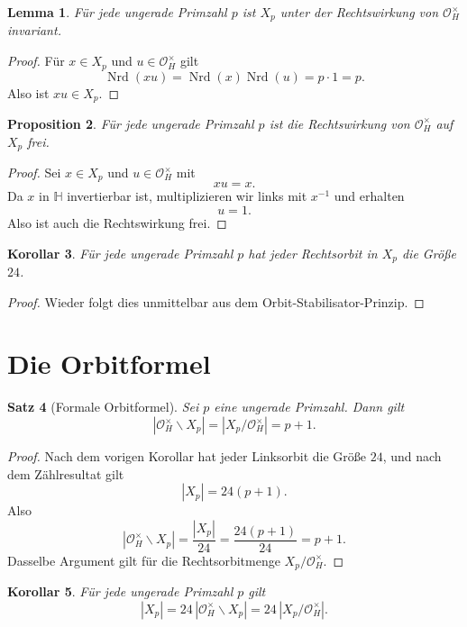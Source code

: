 \documentclass[12pt,a4paper]{article}
\theoremstyle{plain}
\newtheorem{satz}{Satz}[section]
\newtheorem{lemma}[satz]{Lemma}
\newtheorem{proposition}[satz]{Proposition}
\newtheorem{korollar}[satz]{Korollar}
\theoremstyle{definition}
\theoremstyle{remark}
\newcommand{\OH}{\mathcal O_H}
\newcommand{\QH}{\mathbb H}
\newcommand{\nrd}{\operatorname{Nrd}}
\begin{document}
	\begin{lemma}
		Für jede ungerade Primzahl \(p\) ist \(X_p\) unter der Rechtswirkung von \(\OH^\times\) invariant.
	\end{lemma}
	
	\begin{proof}
		Für \(x\in X_p\) und \(u\in\OH^\times\) gilt
		\[
		\nrd(xu)=\nrd(x)\nrd(u)=p\cdot1=p.
		\]
		Also ist \(xu\in X_p\).
	\end{proof}
	
	\begin{proposition}
		Für jede ungerade Primzahl \(p\) ist die Rechtswirkung von \(\OH^\times\) auf \(X_p\) frei.
	\end{proposition}
	
	\begin{proof}
		Sei \(x\in X_p\) und \(u\in\OH^\times\) mit
		\[
		xu=x.
		\]
		Da \(x\) in \(\QH\) invertierbar ist, multiplizieren wir links mit \(x^{-1}\) und erhalten
		\[
		u=1.
		\]
		Also ist auch die Rechtswirkung frei.
	\end{proof}
	
	\begin{korollar}
		Für jede ungerade Primzahl \(p\) hat jeder Rechtsorbit in \(X_p\) die Größe \(24\).
	\end{korollar}
	
	\begin{proof}
		Wieder folgt dies unmittelbar aus dem Orbit-Stabilisator-Prinzip.
	\end{proof}
	
	\section{Die Orbitformel}
	
	\begin{satz}[Formale Orbitformel]
		Sei \(p\) eine ungerade Primzahl. Dann gilt
		\[
		|\OH^\times\backslash X_p|
		=
		|X_p/\OH^\times|
		=
		p+1.
		\]
	\end{satz}
	
	\begin{proof}
		Nach dem vorigen Korollar hat jeder Linksorbit die Größe \(24\), und nach dem Zählresultat gilt
		\[
		|X_p|=24(p+1).
		\]
		Also
		\[
		|\OH^\times\backslash X_p|
		=
		\frac{|X_p|}{24}
		=
		\frac{24(p+1)}{24}
		=
		p+1.
		\]
		Dasselbe Argument gilt für die Rechtsorbitmenge \(X_p/\OH^\times\).
	\end{proof}
	
	\begin{korollar}
		Für jede ungerade Primzahl \(p\) gilt
		\[
		|X_p|=24\,|\OH^\times\backslash X_p|
		=
		24\,|X_p/\OH^\times|.
		\]
	\end{korollar}
	
\end{document}
